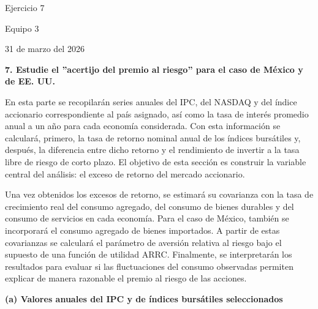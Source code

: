 \documentclass{article}\usepackage[]{graphicx}\usepackage[]{xcolor}
\begin{document}
\newpage
\begin{titlepage}
    \centering
    
    \vspace*{3cm}
    
    {\LARGE Ejercicio 7 \par}
    
    \vspace{0.8cm}
    
    {\Large Equipo 3 \par}
    
    \vspace{0.8cm}
    
    {\Large 31 de marzo del 2026 \par}
    
\end{titlepage}

\newpage
\textbf{7. Estudie el ''acertijo del premio al riesgo'' para el caso de México y de EE. UU.}

En esta parte se recopilarán series anuales del IPC, del NASDAQ y del índice accionario correspondiente al país asignado, así como la tasa de interés promedio anual a un año para cada economía considerada. Con esta información se calculará, primero, la tasa de retorno nominal anual de los índices bursátiles y, después, la diferencia entre dicho retorno y el rendimiento de invertir a la tasa libre de riesgo de corto plazo. El objetivo de esta sección es construir la variable central del análisis: el exceso de retorno del mercado accionario.

Una vez obtenidos los excesos de retorno, se estimará su covarianza con la tasa de crecimiento real del consumo agregado, del consumo de bienes durables y del consumo de servicios en cada economía. Para el caso de México, también se incorporará el consumo agregado de bienes importados. A partir de estas covarianzas se calculará el parámetro de aversión relativa al riesgo bajo el supuesto de una función de utilidad ARRC. Finalmente, se interpretarán los resultados para evaluar si las fluctuaciones del consumo observadas permiten explicar de manera razonable el premio al riesgo de las acciones.

\newpage
\textbf{(a) Valores anuales del IPC y de índices bursátiles seleccionados}
\end{document}
